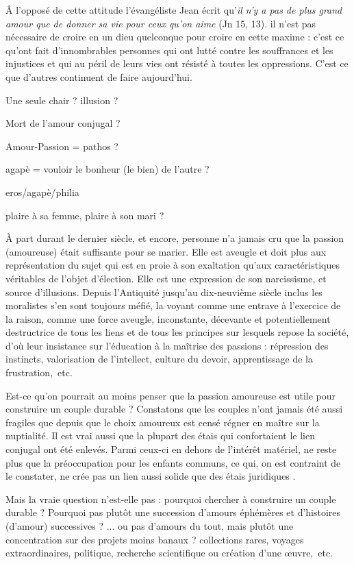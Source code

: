  Â l'opposé de cette attitude l'évangéliste Jean écrit qu'\emph{il n'y a pas de plus grand amour que de donner sa vie pour ceux qu'on aime} (Jn 15, 13). il n'est pas nécessaire de croire en un dieu quelconque pour croire en cette maxime : c'est ce qu'ont fait d'innombrables personnes qui ont lutté contre les souffrances et les injustices et qui au péril de leurs vies ont résisté à toutes les oppressions. C'est ce que d'autres continuent de faire aujourd'hui.

Une seule chair ?  illusion ? 

Mort de l'amour conjugal ? 

Amour-Passion = pathos ?

agapè = vouloir le bonheur (le bien) de l'autre ? 

eros/agapè/philia

plaire à sa femme, plaire à son mari ?


À part durant le dernier siècle, et encore, personne n'a jamais cru que la passion (amoureuse) était suffisante pour se marier. Elle est aveugle et doit plus aux représentation du sujet qui est en proie à son exaltation qu'aux caractéristiques véritables de l'objet d'élection. Elle est une expression de son narcissisme, et source d'illusions. Depuis l'Antiquité jusqu'au dix-neuvième siècle inclus les moralistes s'en sont toujours méfié, la voyant comme une entrave à l'exercice de la raison, comme une force aveugle, inconstante, décevante et potentiellement destructrice de tous les liens et de tous les principes sur lesquels repose la société, d'où leur insistance sur l'éducation à la maîtrise des passions : répression des instincts, valorisation de l'intellect, culture du devoir, apprentissage de la frustration,~etc.
 
 Est-ce qu'on pourrait au moins penser que la passion amoureuse est utile pour construire un couple durable ? Constatons que les couples n'ont jamais été aussi fragiles que depuis que le choix amoureux est censé régner en maître sur la nuptialité. Il est vrai aussi que la plupart des étais qui confortaient le lien conjugal ont été enlevés. Parmi ceux-ci en dehors de l'intérêt matériel, ne reste plus que la préoccupation pour les enfants communs, ce qui, on est contraint de le constater,  ne crée pas un lien aussi solide que des étais juridiques .
 
 Mais la vraie question n'est-elle pas : pourquoi chercher à construire un couple durable ? Pourquoi pas plutôt une succession d'amours éphémères et d'histoires (d'amour) successives ?
 ... ou pas d'amours du tout, mais plutôt une concentration sur des projets moins banaux ? collections rares, voyages extraordinaires, politique, recherche scientifique ou création d'une œuvre,~etc.
 
